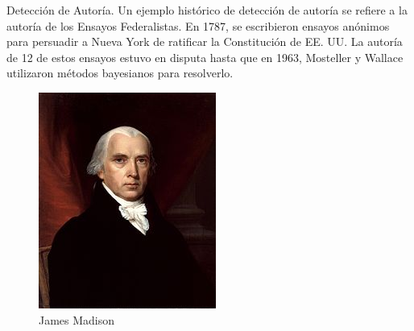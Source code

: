 \documentclass[11pt,fleqn]{book} %
\begin{document}
\begin{example}
Detección de Autoría. Un ejemplo histórico de detección de autoría se refiere a la autoría de los Ensayos Federalistas. En 1787, se escribieron ensayos anónimos para persuadir a Nueva York de ratificar la Constitución de EE. UU. La autoría de 12 de estos ensayos estuvo en disputa hasta que en 1963, Mosteller y Wallace utilizaron métodos bayesianos para resolverlo.

\begin{center}
    \begin{figure}[h]
        \begin{minipage}{0.3\textwidth}
            \centering
            \includegraphics[width=\linewidth]{pics/madison.png}
            \caption{James Madison}
        \end{minipage}\hfill
        \begin{minipage}{0.3\textwidth}
            \centering

\end{minipage}
\end{figure}
\end{center}
\end{example}
\end{document}
